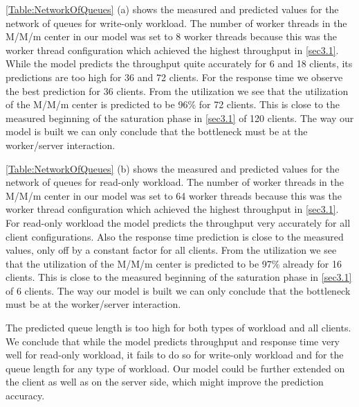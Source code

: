 \documentclass[11pt,a4paper]{article}
\begin{document}
\autoref{Table:NetworkOfQueues} (a) shows the measured and predicted values for the network of queues for write-only workload. The number of worker threads in the M/M/m center in our model was set to 8 worker threads because this was the worker thread configuration which achieved the highest throughput in \autoref{sec3.1}. While the model predicts the throughput quite accurately for 6 and 18 clients, its predictions are too high for 36 and 72 clients. For the response time we observe the best prediction for 36 clients. From the utilization we see that the utilization of the M/M/m center is predicted to be 96\% for 72 clients. This is close to the measured beginning of the saturation phase in \autoref{sec3.1} of 120 clients. The way our model is built we can only conclude that the bottleneck must be at the worker/server interaction.

\autoref{Table:NetworkOfQueues} (b) shows the measured and predicted values for the network of queues for read-only workload. The number of worker threads in the M/M/m center in our model was set to 64 worker threads because this was the worker thread configuration which achieved the highest throughput in \autoref{sec3.1}. For read-only workload the model predicts the throughput very accurately for all client configurations. Also the response time prediction is close to the measured values, only off by a constant factor for all clients.
From the utilization we see that the utilization of the M/M/m center is predicted to be 97\% already for 16 clients. This is close to the measured beginning of the saturation phase in \autoref{sec3.1} of 6 clients. The way our model is built we can only conclude that the bottleneck must be at the worker/server interaction.

The predicted queue length is too high for both types of workload and all clients.
We conclude that while the model predicts throughput and response time very well for read-only workload, it fails to do so for write-only workload and for the queue length for any type of workload.
Our model could be further extended on the client as well as on the server side, which might improve the prediction accuracy. 
\end{document}
